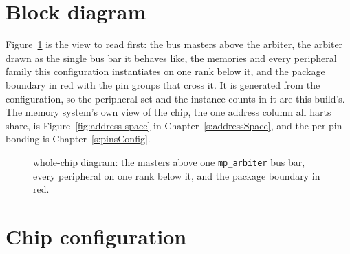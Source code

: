 \documentclass[11pt,pdftex,openany,letterpaper]{report}
\begin{document}
\begin{itemize}[itemsep=1pt]
	
	
\end{itemize}

\section{Block diagram}

Figure~\ref{fig:chip-system-flat-diagram} is the view to read first: the bus masters above the arbiter, the arbiter drawn as the single bus bar it behaves like, the memories and every peripheral family this configuration instantiates on one rank below it, and the package boundary in red with the pin groups that cross it. It is generated from the configuration, so the peripheral set and the instance counts in it are this build's. The memory system's own view of the chip, the one address column all \NumHartsWord{} harts share, is Figure~\ref{fig:address-space} in Chapter~\ref{s:addressSpace}, and the per-pin bonding is Chapter~\ref{s:pinsConfig}.

\begin{figure}[!htb]
	\centering
	\resizebox{\linewidth}{!}{}
	\caption[{\AsicNameForUserGuide{} whole-chip diagram}]{\AsicNameForUserGuide{} whole-chip diagram: the masters above one \texttt{mp\_arbiter} bus bar, every peripheral on one rank below it, and the package boundary in red.}
	\label{fig:chip-system-flat-diagram}
\end{figure}
\FloatBarrier

\section{Chip configuration} \label{ss:chipConfig}
\end{document}
